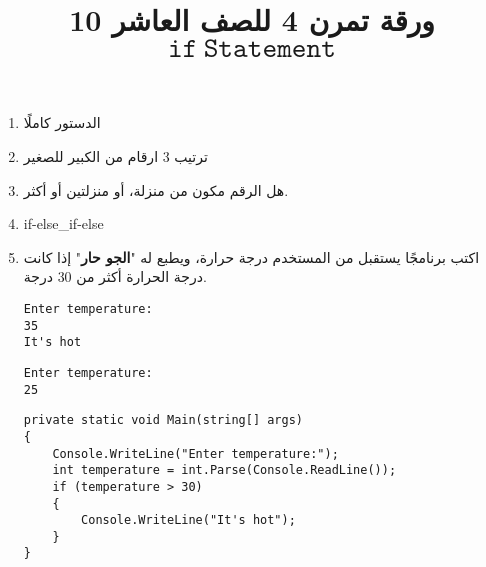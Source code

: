 \documentclass[12pt, twoside]{article}
\title{ورقة تمرن 4 للصف العاشر 10 $\mathtt{if\ Statement}$}
\begin{document}
\maketitle
\thispagestyle{fancy}

\ifdetailed
\begin{enumerate}[itemsep=3em]
\else
\begin{enumerate}
\fi

\item الدستور كاملًا
\item ترتيب 3 ارقام من الكبير للصغير
\item هل الرقم مكون من منزلة، أو منزلتين أو أكثر.
\item if-else\_if-else

\item
اكتب برنامجًا يستقبل من المستخدم درجة حرارة، ويطبع له "\textbf{الجو حار}" إذا كانت درجة الحرارة أكثر من 30 درجة.
\ifdetailed
\begin{example}[1]
\begin{english}
\begin{verbatim}
Enter temperature:
35
It's hot
\end{verbatim}
\end{english}
\end{example}

\begin{example}[2]
\begin{english}
\begin{verbatim}
Enter temperature:
25
\end{verbatim}
\end{english}
\end{example}

\ifwithsols
\begin{solution}
\begin{english}
\begin{verbatim}
private static void Main(string[] args)
{
    Console.WriteLine("Enter temperature:");
    int temperature = int.Parse(Console.ReadLine());
    if (temperature > 30)
    {
        Console.WriteLine("It's hot");
    }
}
\end{verbatim}
\end{english}
\end{solution}
\clearpage
\fi
\fi


\end{enumerate}
\end{enumerate}
\end{document}
